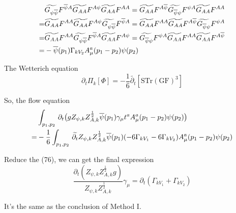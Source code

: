 \documentclass[UTF8]{ctexart}
\begin{document}
\begin{align}
&\widetilde{G_{\psi\overline{\psi}}}F^{\overline{\psi}A}\widetilde{G_{AA}}F^{A\psi}\widetilde{G_{AA}}F^{AA}=\widetilde{G_{AA}}F^{A\overline{\psi}}\widetilde{G_{\overline{\psi}\psi}}F^{\psi A}\widetilde{G_{AA}}F^{AA}
\notag\\=&\widetilde{G_{AA}}F^{AA}\widetilde{G_{AA}}F^{A\psi}\widetilde{G_{\psi\overline{\psi}}}F^{\overline{\psi}A}=\widetilde{G_{AA}}F^{AA}\widetilde{G_{AA}}F^{A\overline{\psi}}\widetilde{G_{\overline{\psi}\psi}}F^{\psi A}
\notag\\=&\widetilde{G_{AA}}F^{AA}\widetilde{G_{\psi\overline{\psi}}}F^{\overline{\psi}A}\widetilde{G_{AA}}F^{A\psi}=\widetilde{G_{\overline{\psi}\psi}}F^{\psi A}\widetilde{G_{AA}}F^{AA}\widetilde{G_{AA}}F^{A\overline{\psi}}
\notag\\=&-\overline{\psi}(p_1)\Gamma_{kV_2}A_{\mu}^{a}(p_1-p_2)\psi(p_2)
\end{align}
\par The Wetterich equation
\begin{equation}
\partial_{t}\Pi_k [\Phi]=-\frac{1}{6}\widetilde{\partial_{t}}[\mathrm{STr}{(\mathrm{GF})}^3]
\end{equation}
\par So, the flow equation
\begin{align}
&\int_{p_1,p_2}\,\partial_{t}\big(gZ_{\psi,k}Z_{A,k}^{\frac{1}{2}}\overline{\psi}(p_1)\gamma_{\mu}t^{a}A_{\mu}^{a}(p_1-p_2)\psi(p_2)\big)
\notag\\=&-\frac{1}{6}\int_{p_1,p_2}\,\widetilde{\partial_{t}}Z_{\psi,k}Z_{A,k}^{\frac{1}{2}}\overline{\psi}(p_1)(-6\Gamma_{kV_1}-6\Gamma_{kV_2})A_{\mu}^{a}(p_1-p_2)\psi(p_2)
\end{align}
\par Reduce the (76), we can get the final expression
\begin{equation}
\frac{\partial_{t}(Z_{\psi,k}Z_{A,k}^{\frac{1}{2}}g)}{Z_{\psi,k}Z_{A,k}^{\frac{1}{2}}}\gamma_{\mu}=\partial_{t}(\Gamma_{kV_1}+\Gamma_{kV_2})
\end{equation}
\par It's the same as the conclusion of Method I.
\end{document}

